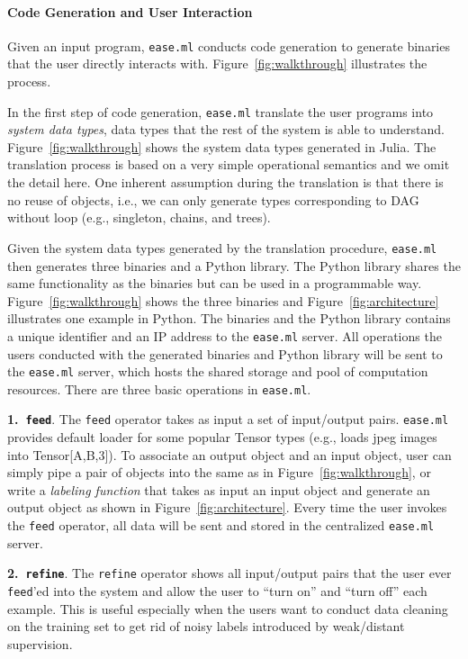 \documentclass[letterpaper]{vldb}
\newcommand{\eml}{\texttt{ease.ml}\xspace}
\begin{document}
\vspace{-2em}
\paragraph*{Code Generation and User Interaction}

Given an input program, \eml conducts code generation
to generate binaries that the user directly interacts with.
Figure~\ref{fig:walkthrough} illustrates the process.

In the first step of code generation, \eml translate
the user programs into {\em system data types}, data types
that the rest of the system is able to understand. 
Figure~\ref{fig:walkthrough} shows the system data types
generated in Julia. The translation process is based
on a very simple operational semantics and we omit the detail
here. One inherent assumption during the translation
is that there is no reuse of objects, i.e., we can 
only generate types corresponding to DAG without loop
(e.g., singleton, chains, and trees). 

Given the system data types generated by the translation
procedure, \eml then generates three binaries and
a Python library.
The Python library shares the same functionality as
the binaries but can be used in a programmable way.
Figure~\ref{fig:walkthrough} shows the three binaries
and Figure~\ref{fig:architecture} illustrates one
example in Python. The binaries and the Python library
contains a unique identifier and an IP address to the
\eml server. All operations the users conducted with
the generated binaries and Python library will be 
sent to the \eml server, which hosts the shared
storage and pool of computation resources.
There are three basic operations in \eml.

\noindent
{\textbf{1.~\texttt{feed}}.} The \texttt{feed} operator takes
as input a set of input/output pairs. \eml provides
default loader for some popular Tensor types (e.g., loads
jpeg images into Tensor[A,B,3]). To associate an output
object and an input object, user can simply pipe a pair of
objects into the same as in Figure~\ref{fig:walkthrough}, or
write a {\em labeling function} that takes as input an input
object and generate an output object as shown in Figure~\ref{fig:architecture}.
Every time the user invokes the \texttt{feed} operator,
all data will be sent and stored in the centralized
\eml server.

\noindent
{\textbf{2.~\texttt{refine}}.} The \texttt{refine} operator
shows all input/output pairs that the user ever \texttt{feed}'ed
into the system and allow the user to ``turn on''
and ``turn off'' each example. This is useful especially when
the users want to conduct data cleaning on the training set
to get rid of noisy labels introduced by weak/distant supervision.
\end{document}
